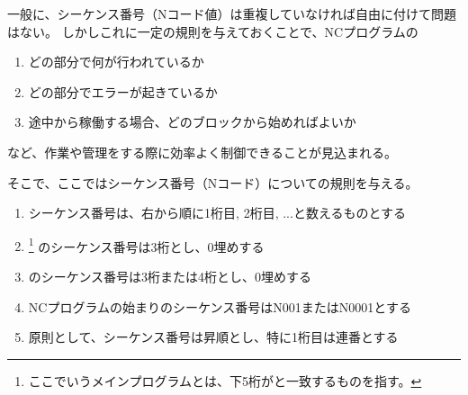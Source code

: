 

一般に、シーケンス番号（Nコード値）は重複していなければ自由に付けて問題はない。
しかしこれに一定の規則を与えておくことで、NCプログラムの
\begin{enumerate}[label=\sarrow]
\item どの部分で何が行われているか
\item どの部分でエラーが起きているか
\item 途中から稼働する場合、どのブロックから始めればよいか
\end{enumerate}
など、作業や管理をする際に効率よく制御できることが見込まれる。

そこで、ここではシーケンス番号（Nコード）についての規則を与える。



\begin{enumerate}[label=\Roman*), ref=\Roman*)]
\item {}シーケンス番号は、右から順に1桁目, 2桁目, ...と数えるものとする
\item {}\nameCreatedNCMainPrg%
\footnote{ここでいうメインプログラムとは、下5桁が\DrawingNumber と一致するものを指す。}%
のシーケンス番号は3桁とし、0埋めする
\item {}\nameCreatedNCSubPrg のシーケンス番号は3桁または4桁とし、0埋めする
\item {}NCプログラムの始まりのシーケンス番号は{\ttfamily N001}または{\ttfamily N0001}とする
\item 原則として、シーケンス番号は昇順とし、特に1桁目は連番とする
\end{enumerate}


